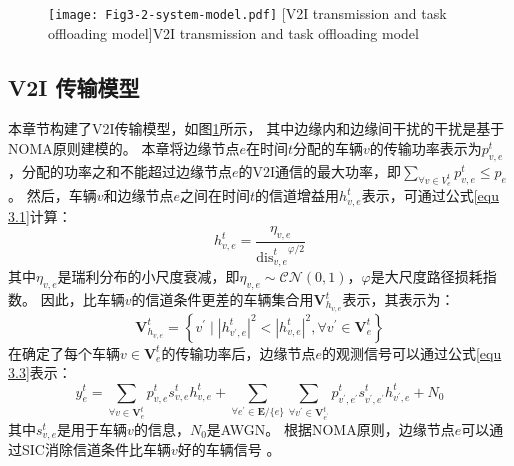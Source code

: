 \begin{figure}[h]
\centering
  \texttt{[image: Fig3-2-system-model.pdf]}
  [V2I transmission and task offloading model]{V2I transmission and task offloading model}
  \label{fig 3-2}
\end{figure}

\subsection[\hspace{-2pt}V2I 传输模型]{{ \hspace{-8pt}V2I 传输模型}}

本章节构建了V2I传输模型，如图\ref{fig 3-2}所示， 其中边缘内和边缘间干扰的干扰是基于NOMA原则建模的。
本章将边缘节点$e$在时间$t$分配的车辆$v$的传输功率表示为$p_{v, e}^{t}$，分配的功率之和不能超过边缘节点$e$的V2I通信的最大功率，即$\sum_{\forall v \in {V}_{e}^{t}} p_{v, e}^{t} \leq p_{e}$。
然后，车辆$v$和边缘节点$e$之间在时间$t$的信道增益用$h_{v, e}^t$表示，可通过公式\ref{equ 3.1}\cite{sun2020performance}计算：
\begin{equation}
	h_{v, e}^t = \frac{\eta_{v, e}}{{\operatorname{dis}_{v, e}^{t}}^{\varphi/2}}
	\label{equ 3.1}
\end{equation}
\noindent 其中$\eta_{v, e}$是瑞利分布的小尺度衰减，即$\eta_{v, e} \sim \mathcal{CN}(0, 1)$，$\varphi$是大尺度路径损耗指数。
因此，比车辆$v$的信道条件更差的车辆集合用$\mathbf{V}_{h_{v, e}}^{t}$表示，其表示为：
\begin{equation}
	\mathbf{V}_{h_{v, e}}^{t} = \left \{ v^{\prime} \mid  \left|h_{v^{\prime}, e}^t \right|^{2} < \left| h_{v, e}^t\right |^{2} , \forall v^{\prime} \in \mathbf{V}_{e}^{t} \right \}
\end{equation}
在确定了每个车辆$v \in \mathbf{V}_{e}^{t}$的传输功率后，边缘节点$e$的观测信号可以通过公式\ref{equ 3.3}\cite{islam2017power}表示：
\begin{equation}
	y_e^{t} = \sum_{\forall v \in \mathbf{V}_{e}^{t}} p_{v, e}^{t} s_{v, e}^{t} h_{v, e}^t + \sum\limits_{\forall e^{\prime} \in \mathbf{E} / \{e\}} \sum\limits_{\forall v^{\prime} \in \mathbf{V}_{e^{\prime}}^{t}} p_{v^{\prime}, e^{\prime}}^{t} s_{v^{\prime}, e^{\prime}}^{t} h_{v^{\prime}, e}^t + N_{0}
	\label{equ 3.3}
\end{equation}
其中$s_{v, e}^{t}$是用于车辆$v$的信息，$N_{0}$是AWGN。
根据NOMA原则，边缘节点$e$可以通过SIC消除信道条件比车辆$v$好的车辆信号 \cite{du2021ji}。
